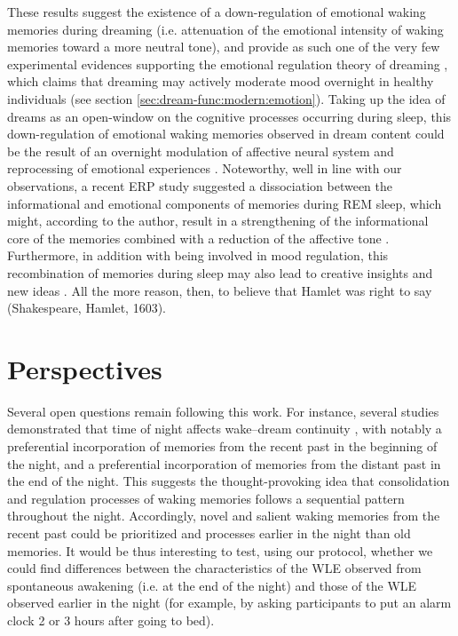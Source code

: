 These results suggest the existence of a down-regulation of emotional waking memories during dreaming (i.e. attenuation of the emotional intensity of waking memories toward a more neutral tone), and provide as such one of the very few experimental evidences supporting the emotional regulation theory of dreaming \citep{cartwright_role_1998, cartwright_role_1998-1, perogamvros_roles_2012}, which claims that dreaming may actively moderate mood overnight in healthy individuals (see section \ref{sec:dream-func:modern:emotion}). Taking up the idea of dreams as an open-window on the cognitive processes occurring during sleep, this down-regulation of emotional waking memories observed in dream content could be the result of an overnight modulation of affective neural system and reprocessing of emotional experiences \citep{walker_overnight_2009, goldstein_role_2014}. Noteworthy, well in line with our observations, a recent ERP study suggested a dissociation between the informational and emotional components of memories during REM sleep, which might, according to the author, result in a strengthening of the informational core of the memories combined with a reduction of the affective tone \citep{groch_role_2013}. Furthermore, in addition with being involved in mood regulation, this recombination of memories during sleep may also lead to creative insights and new ideas \citep{maquet_psychology:_2004, payne_sleep_2004, edwards_dreaming_2013, barrett_dreams_2017}. All the more reason, then, to believe that Hamlet was right to say  (Shakespeare, Hamlet, 1603).

\section{Perspectives}
\label{disc:drf:summary:perspectives}

Several open questions remain following this work. For instance, several studies demonstrated that time of night affects wake–dream continuity \citep{roffwarg_effects_1978, malinowski_effect_2014}, with notably a preferential incorporation of memories from the recent past in the beginning of the night, and a preferential incorporation of memories from the distant past in the end of the night. This suggests the thought-provoking idea that consolidation and regulation processes of waking memories follows a sequential pattern throughout the night. Accordingly, novel and salient waking memories from the recent past could be prioritized and processes earlier in the night than old memories. It would be thus interesting to test, using our protocol, whether we could find differences between the characteristics of the WLE observed from spontaneous awakening (i.e. at the end of the night) and those of the WLE observed earlier in the night (for example, by asking participants to put an alarm clock 2 or 3 hours after going to bed).

